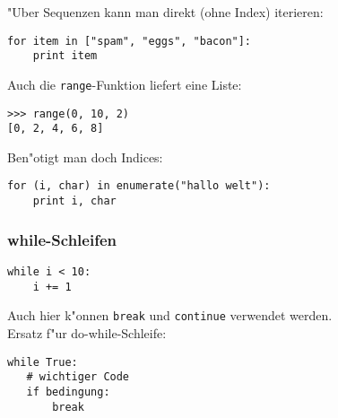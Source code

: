 \begin{frame}[fragile]
"Uber Sequenzen kann man direkt (ohne Index) iterieren:
\begin{lstlisting}[style=Python]
for item in ["spam", "eggs", "bacon"]:
    print item
\end{lstlisting}

Auch die \texttt{range}-Funktion liefert eine Liste:
\begin{lstlisting}[style=Shell]
>>> range(0, 10, 2)
[0, 2, 4, 6, 8]
\end{lstlisting}
Ben"otigt man doch Indices:
\begin{lstlisting}[style=Python]
for (i, char) in enumerate("hallo welt"):
    print i, char
\end{lstlisting}
\end{frame}

\begin{frame}[fragile]
\frametitle{while-Schleifen}
\begin{lstlisting}[style=Python]
while i < 10:
    i += 1
\end{lstlisting}
Auch hier k"onnen \lstinline{break} und \lstinline{continue} verwendet werden.\\[3mm]
Ersatz f"ur do-while-Schleife:
\begin{lstlisting}[style=Python]
while True:
   # wichtiger Code
   if bedingung:
       break
\end{lstlisting} 
\end{frame}

